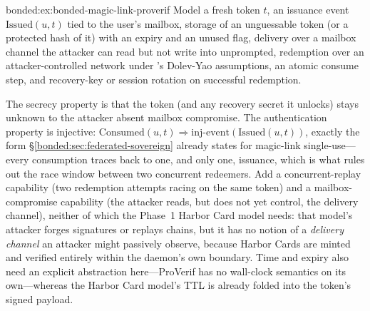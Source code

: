 \begin{pdSolution}{bonded:ex:bonded-magic-link-proverif}
Model a fresh token $t$, an issuance event $\mathrm{Issued}(u,t)$ tied to the user's mailbox, storage of an unguessable token (or a protected hash of it) with an expiry and an unused flag, delivery over a mailbox channel the attacker can read but not write into unprompted, redemption over an attacker-controlled network under 's Dolev-Yao assumptions, an atomic consume step, and recovery-key or session rotation on successful redemption.

The secrecy property is that the token (and any recovery secret it unlocks) stays unknown to the attacker absent mailbox compromise. The authentication property is injective: $\mathrm{Consumed}(u,t) \Rightarrow \mathrm{inj\text{-}event}(\mathrm{Issued}(u,t))$, exactly the form \S\ref{bonded:sec:federated-sovereign} already states for magic-link single-use---every consumption traces back to one, and only one, issuance, which is what rules out the race window between two concurrent redeemers. Add a concurrent-replay capability (two redemption attempts racing on the same token) and a mailbox-compromise capability (the attacker reads, but does not yet control, the delivery channel), neither of which the Phase~1 Harbor Card model needs: that model's attacker forges signatures or replays chains, but it has no notion of a \emph{delivery channel} an attacker might passively observe, because Harbor Cards are minted and verified entirely within the daemon's own boundary. Time and expiry also need an explicit abstraction here---ProVerif has no wall-clock semantics on its own---whereas the Harbor Card model's TTL is already folded into the token's signed payload.
\end{pdSolution}
